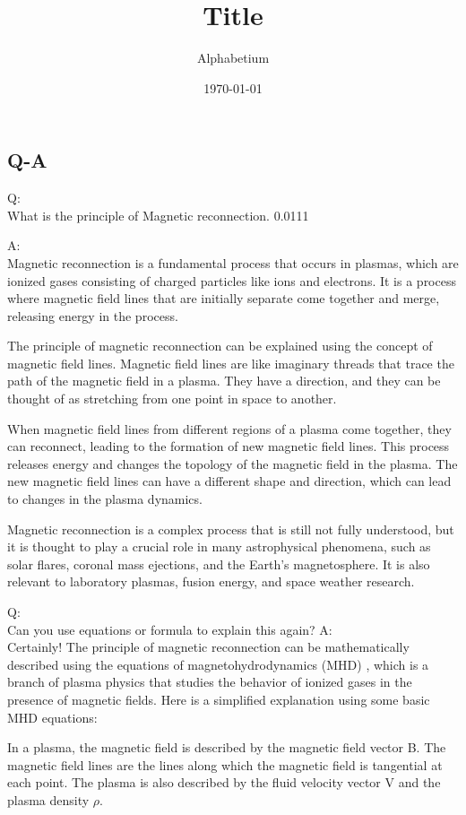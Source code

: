 \documentclass[12pt, a4paper, oneside]{article}
\title{Title}
\date{\today}
\author{Alphabetium}
\begin{document}
\begin{spacing}{2.0}
\maketitle


\section{Q-A}
Q:\\
What is the principle of Magnetic reconnection. 0.0111

A:\\
Magnetic reconnection is a fundamental process that occurs in plasmas, which are ionized gases consisting of charged particles like ions and electrons. It is a process where magnetic field lines that are initially separate come together and merge, releasing energy in the process.

The principle of magnetic reconnection can be explained using the concept of magnetic field lines. Magnetic field lines are like imaginary threads that trace the path of the magnetic field in a plasma. They have a direction, and they can be thought of as stretching from one point in space to another.

When magnetic field lines from different regions of a plasma come together, they can reconnect, leading to the formation of new magnetic field lines. This process releases energy and changes the topology of the magnetic field in the plasma. The new magnetic field lines can have a different shape and direction, which can lead to changes in the plasma dynamics.

Magnetic reconnection is a complex process that is still not fully understood, but it is thought to play a crucial role in many astrophysical phenomena, such as solar flares, coronal mass ejections, and the Earth's magnetosphere. It is also relevant to laboratory plasmas, fusion energy, and space weather research.

Q:\\
Can you use equations or formula to explain this again?
A:\\
Certainly! The principle of magnetic reconnection can be mathematically described using the equations of magnetohydrodynamics (MHD)
, which is a branch of plasma physics that studies the behavior of ionized gases in the presence of magnetic fields. 
Here is a simplified explanation using some basic MHD equations:

In a plasma, the magnetic field is described by the magnetic field vector B. The magnetic field lines are 
the lines along which the magnetic field is tangential at each point. The plasma is also described by the fluid velocity 
vector V and the plasma density $\rho$.


\end{spacing}
\end{document}

